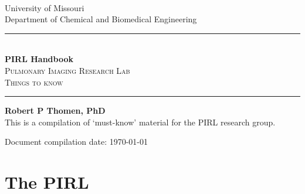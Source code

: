\documentclass[11pt]{book}
\begin{document}
\setlength{\baselineskip}{1.2\baselineskip}

\begin{titlepage}
\begin{center}



\; \\ \; \\ \; \\ \; \\ \; \\ \; \\

\Large University of Missouri \\
\Large Department of Chemical and Biomedical Engineering\\

\vspace{2.5cm}




\rule{6cm}{1pt}\\
\vspace{.3cm}
\Large \textbf{PIRL Handbook}\\
\vspace{.5cm}
\textsc{\Large Pulmonary Imaging Research Lab \\ Things to know}\\

\vspace{.1cm}
\rule{6cm}{1pt}

\vspace{4cm}
\Large \textbf{Robert P Thomen, PhD}\\



\vspace{4cm}
\Large This is a compilation of `must-know' material for the PIRL research group.

Document compilation date: \today
\tableofcontents

\end{center}
\end{titlepage}


\chapter{The PIRL}
\end{document}
